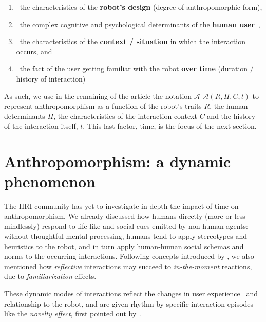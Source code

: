 \documentclass{frontiersSCNS} %
\newcommand{\Ant}[1][]{%
      \ifthenelse{\isempty{#1}}%
        {$\mathcal{A}$}
        {$\mathcal{A}(#1)$}
}
\begin{document}
\begin{enumerate}

\item ~the characteristics of the \textbf{robot's design} (degree of
    anthropomorphic form),

\item ~the complex cognitive and psychological determinants of the \textbf{human
    user}~\citep{epley_seeing_2007},

\item ~the characteristics of the \textbf{context / situation} in which the
    interaction occurs, and

\item ~the fact of the user getting familiar with the robot \textbf{over time}
    (duration / history of interaction)

\end{enumerate}

As such, we use in the remaining of the article the notation \Ant[R,H,C,t] to
represent anthropomorphism as a function of the robot's traits $R$, the human
determinants $H$, the characteristics of the interaction context $C$ and the
history of the interaction itself, $t$. This last factor, time, is the focus of
the next section.

%
%
%
%
%
%

\section{Anthropomorphism: a dynamic phenomenon}
\label{sec:our-ideas}

The HRI community has yet to investigate in depth the impact of time on
anthropomorphism. We already discussed how humans directly (more or less
mindlessly) respond to life-like and social cues emitted by non-human agents:
without thoughtful mental processing, humans tend to apply stereotypes and
heuristics to the robot, and in turn apply human-human social schemas and norms
to the occurring interactions. Following concepts introduced by
\cite{takayama_perspectives_2012}, we also mentioned how \emph{reflective}
interactions may succeed to \emph{in-the-moment} reactions, due to
\emph{familiarization} effects.

These dynamic modes of interactions reflect the changes in user
experience~\citep{karapanos_user_2009} and relationship to the robot, and are
given rhythm by specific interaction episodes like the \emph{novelty effect},
first pointed out by~\cite{kanda_interactive_2004}.
\end{document}
